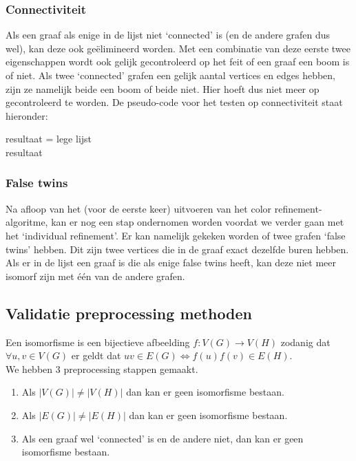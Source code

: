 \documentclass{article}
\begin{document}
\subsubsection{Connectiviteit}
Als een graaf als enige in de lijst niet ‘connected’ is (en de andere grafen dus wel), kan deze ook ge\"elimineerd worden. Met een combinatie van deze eerste twee eigenschappen wordt ook gelijk gecontroleerd op het feit of een graaf een boom is of niet. Als twee ‘connected’ grafen een gelijk aantal vertices en edges hebben, zijn ze namelijk beide een boom of beide niet. Hier hoeft dus niet meer op gecontroleerd te worden. De pseudo-code voor het testen op connectiviteit staat hieronder:\\

\begin{algorithm}[H]
	resultaat = lege lijst\\
	\Return resultaat
\end{algorithm}

\subsubsection{False twins}
Na afloop van het (voor de eerste keer) uitvoeren van het color refinement-algoritme, kan er nog een stap ondernomen worden voordat we verder gaan met het ‘individual refinement’. Er kan namelijk gekeken worden of twee grafen ‘false twins’ hebben. Dit zijn twee vertices die in de graaf exact dezelfde buren hebben. Als er in de lijst een graaf is die als enige false twins heeft, kan deze niet meer isomorf zijn met \'e\'en van de andere grafen.

\subsection{Validatie preprocessing methoden}

Een isomorfisme is een bijectieve afbeelding $f:V(G) \rightarrow V(H)$ zodanig dat $\forall u,v \in V(G)$ er geldt dat $uv \in E(G) \Leftrightarrow f(u)f(v)\in E(H)$.\\

We hebben 3 preprocessing stappen gemaakt.
\begin{enumerate}
\item Als $|V(G)|\neq|V(H)|$ dan kan er geen isomorfisme bestaan.
\item Als $|E(G)|\neq|E(H)|$ dan kan er geen isomorfisme bestaan.
\item Als een graaf wel `connected' is en de andere niet, dan kan er geen isomorfisme bestaan.
\end{enumerate}
\end{document}
